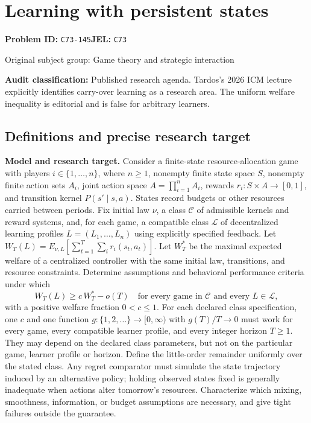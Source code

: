 \documentclass[11pt,a4paper]{article}
\begin{document}
\section*{Learning with persistent states}
\textbf{Problem ID:} \texttt{C73-145}\quad \textbf{JEL:} \texttt{C73}\par
\label{problem:OP-0285}
{\sffamily\small\color{muted}Original subject group: Game theory and strategic interaction\par}
\label{definitions:problem:30007567}
\textbf{Audit classification:} Published research agenda. Tardos’s 2026 ICM lecture explicitly identifies carry-over learning as a research area. The uniform welfare inequality is editorial and is false for arbitrary learners.
\subsection*{Definitions and precise research target}
\textbf{Model and research target.} Consider a finite-state resource-allocation game with players \(i\in\{1,\ldots,n\}\), where \(n\ge1\), nonempty finite state space \(S\), nonempty finite action sets \(A_i\), joint action space \(A=\prod_{i=1}^n A_i\), rewards \(r_i:S\times A\to[0,1]\), and transition kernel \(P(s'\mid s,a)\). States record budgets or other resources carried between periods. Fix initial law \(\nu\), a class \(\mathcal C\) of admissible kernels and reward systems, and, for each game, a compatible class \(\mathcal L\) of decentralized learning profiles \(L=(L_1,\ldots,L_n)\) using explicitly specified feedback. Let \(W_T(L)=E_{\nu,L}[\sum_{t=1}^T\sum_i r_i(s_t,a_t)]\). Let \(W_T^*\) be the maximal expected welfare of a centralized controller with the same initial law, transitions, and resource constraints. Determine assumptions and behavioral performance criteria under which
\[
 W_T(L)\geq c\,W_T^*-o(T)
 \quad\text{for every game in }\mathcal C\text{ and every }L\in\mathcal L,
\]
with a positive welfare fraction \(0<c\le1\). For each declared class specification, one \(c\) and one function \(g:\{1,2,\ldots\}\to[0,\infty)\) with \(g(T)/T\to0\) must work for every game, every compatible learner profile, and every integer horizon \(T\ge1\). They may depend on the declared class parameters, but not on the particular game, learner profile or horizon. Define the little-order remainder uniformly over the stated class. Any regret comparator must simulate the state trajectory induced by an alternative policy; holding observed states fixed is generally inadequate when actions alter tomorrow's resources. Characterize which mixing, smoothness, information, or budget assumptions are necessary, and give tight failures outside the guarantee.
\end{document}
